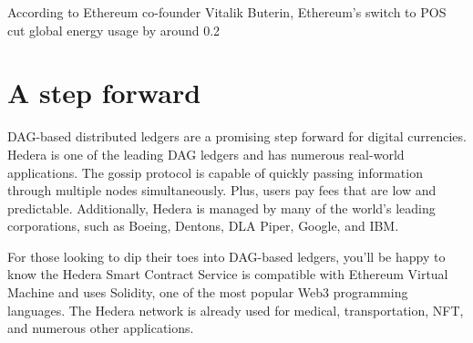 \documentclass{article}
\begin{document}
According to Ethereum co-founder Vitalik Buterin, Ethereum’s switch to POS cut global energy usage by around 0.2%

\section{A step forward}
DAG-based distributed ledgers are a promising step forward for digital currencies. Hedera is one of the leading DAG ledgers and has numerous real-world applications. The gossip protocol is capable of quickly passing information through multiple nodes simultaneously. Plus, users pay fees that are low and predictable. Additionally, Hedera is managed by many of the world’s leading corporations, such as Boeing, Dentons, DLA Piper, Google, and IBM.

For those looking to dip their toes into DAG-based ledgers, you’ll be happy to know the Hedera Smart Contract Service is compatible with Ethereum Virtual Machine and uses Solidity, one of the most popular Web3 programming languages. The Hedera network is already used for medical, transportation, NFT, and numerous other applications.
\end{document}
